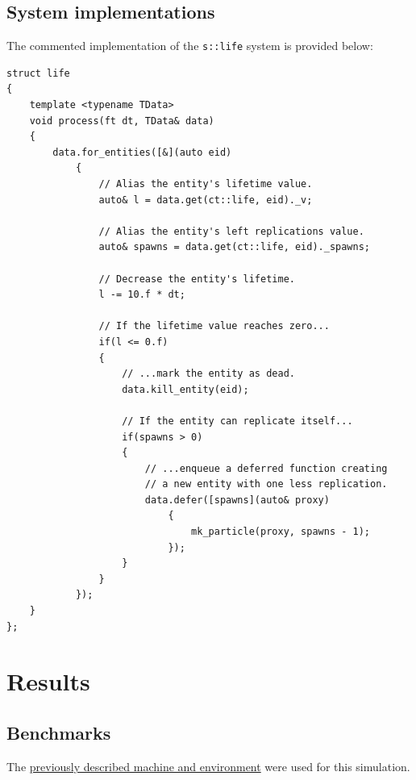 \documentclass[oneside, 12pt, a4paper, openany]{book}
\begin{document}
\subsection{System implementations}\label{system-implementations-1}

The commented implementation of the
\texttt{s::life}
system is provided below:

\begin{verbatim}
struct life
{
    template <typename TData>
    void process(ft dt, TData& data)
    {
        data.for_entities([&](auto eid)
            {
                // Alias the entity's lifetime value.
                auto& l = data.get(ct::life, eid)._v;

                // Alias the entity's left replications value.
                auto& spawns = data.get(ct::life, eid)._spawns;

                // Decrease the entity's lifetime.
                l -= 10.f * dt;

                // If the lifetime value reaches zero...
                if(l <= 0.f)
                {
                    // ...mark the entity as dead.
                    data.kill_entity(eid);

                    // If the entity can replicate itself...
                    if(spawns > 0)
                    {
                        // ...enqueue a deferred function creating
                        // a new entity with one less replication.
                        data.defer([spawns](auto& proxy)
                            {
                                mk_particle(proxy, spawns - 1);
                            });
                    }
                }
            });
    }
};
\end{verbatim}

\section{Results}\label{results-1}

\subsection{Benchmarks}\label{benchmarks}

The \protect\hyperlink{bench_particlesim}{previously described machine
and environment} were used for this simulation.
\end{document}
